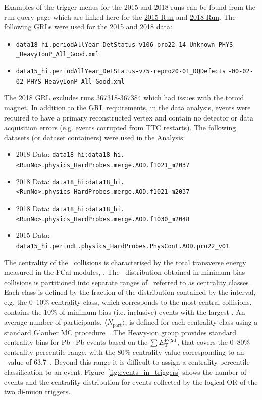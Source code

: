 Examples of the trigger menus for the 2015 and 2018 runs can be found
  from the run query page which are linked here for the 
  \href{https://atlas-runquery.cern.ch/query.py?q=find+run+286711++%2F+show+all}{2015 Run}
  and
  \href{https://atlas-runquery.cern.ch/query.py?q=find+run+365512+%2F+show+all}{2018 Run}.
The following GRLs were used for the 2015 and 2018 data:
\begin{itemize}
\item \verb=data18_hi.periodAllYear_DetStatus-v106-pro22-14_Unknown_PHYS= \newline 
      \verb=_HeavyIonP_All_Good.xml=
\item \verb=data15_hi.periodAllYear_DetStatus-v75-repro20-01_DQDefects= \newline 
      \verb=-00-02-02_PHYS_HeavyIonP_All_Good.xml=
\end{itemize}
The 2018 GRL excludes runs 367318-367384 which had issues with the toroid magnet. 
In addition to the GRL requirements, in the data analysis, events were required 
  to have a primary reconstructed vertex and contain no detector or data 
  acquisition errors (e.g. events corrupted from TTC restarts).
The following datasets (or dataset containers) were used in the Analysis:
\begin{itemize}
\item 2018 Data: {\small \verb=data18_hi:data18_hi.<RunNo>.physics_HardProbes.merge.AOD.f1021_m2037=}
\item 2018 Data: {\small \verb=data18_hi:data18_hi.<RunNo>.physics_HardProbes.merge.AOD.f1021_m2037=}
\item 2018 Data: {\small \verb=data18_hi:data18_hi.<RunNo>.physics_HardProbes.merge.AOD.f1030_m2048=}
\item 2015 Data: {\small \verb=data15_hi.periodL.physics_HardProbes.PhysCont.AOD.pro22_v01=}
\end{itemize}


The centrality of the \PbPb\ collisions is characterised by the total
  transverse energy measured in the FCal modules, \ETfcal. 
The \ETfcal\ distribution obtained in minimum-bias collisions is partitioned 
  into separate ranges of \ETfcal\ referred to as centrality
  classes~\cite{Miller:2007ri,Alver:2008aq,HION-2011-05}. 
Each class is defined by the fraction of the distribution contained by 
  the interval, e.g. the 0--10\% centrality class, which corresponds 
  to the most central collisions, contains the 10\% of minimum-bias (i.e. inclusive)
  events with the largest \ETfcal.
An average number of participants, $\langle N_{\mathrm{part}} \rangle$, 
  is defined for each centrality class using a standard Glauber MC 
  procedure~\cite{Perepelitsa:2212936,CentralityRec}. 
The Heavy-ion group provides standard centrality bins 
  for Pb+Pb events based on the $\mbox{$\sum E_{\mathrm{T}}^{\mathrm{FCal}}$}$, that covers the 0--80\%  
  centrality-percentile range, with the 80\% centrality value corresponding to 
  an \ETfcal\ value of 63.7~\GeV.
Beyond this range it is difficult to assign a centrality-percentile classification 
  to an event.
Figure~\ref{fig:events_in_triggers} shows the number of events
  and the centrality distribution for events collected by the 
  logical OR of the two di-muon triggers.

